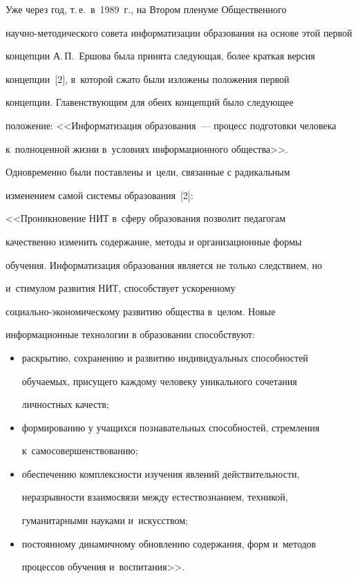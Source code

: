  Уже через год, т.\,е.\ в~1989~г., на Втором пленуме Общественного


 на\-уч\-но-ме\-то\-ди\-че\-ско\-го совета информатизации образования на основе этой первой


концепции А.\,П.~Ершова была принята следующая, более краткая версия


концепции~[2], в~которой сжато были изложены положения первой


концепции. Главенствующим для обеих концепций было следующее


положение: <<Информатизация образования~--- процесс подготовки человека


к~полноценной жизни в~условиях информационного общества>>.


Одновременно были поставлены и~цели, связанные с радикальным


изменением самой сис\-те\-мы образования~[2]:








  <<Проникновение НИТ в~сферу образования позволит педагогам


качественно изменить содержание, методы и организационные формы


обучения. Информатизация образования является не только следствием, но


и~стимулом развития НИТ, способствует ускоренному


  со\-ци\-аль\-но-эко\-но\-ми\-че\-ско\-му развитию общества в~целом. Новые


информационные технологии в образовании способствуют:


  \begin{itemize}


\item раскрытию, сохранению и развитию индивидуальных способностей


обуча\-емых, присущего каждому человеку уникального сочетания


личностных качеств;


\item формированию у учащихся познавательных способностей, стремления


к~самосовершенствованию;


\item обеспечению комплексности изучения явлений действительности,


неразрывности взаимосвязи между естествознанием, техникой,


гуманитарными науками и~искусством;


\item постоянному динамичному обновлению содержания, форм и~методов


процессов обучения и~воспитания>>.


\end{itemize}





